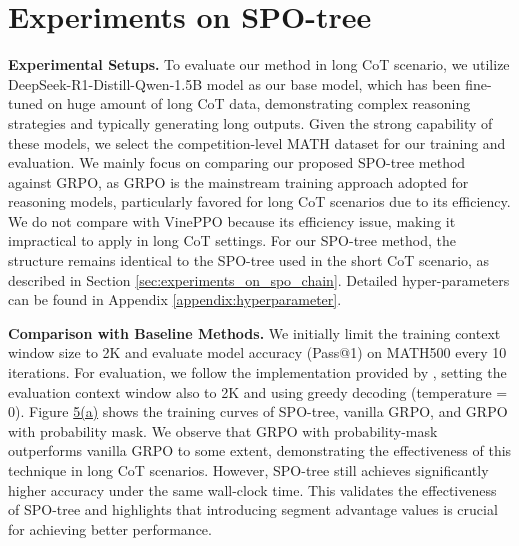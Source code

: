 \section{Experiments on SPO-tree}
\label{sec:experiments_on_spo_tree}

\textbf{Experimental Setups.}
To evaluate our method in long CoT scenario, we utilize DeepSeek-R1-Distill-Qwen-1.5B model as our base model, which has been fine-tuned on huge amount of long CoT data, demonstrating complex reasoning strategies and typically generating long outputs. Given the strong capability of these models, we select the competition-level MATH \cite{hendrycks2021measuringmathematicalproblemsolving} dataset for our training and evaluation. We mainly focus on comparing our proposed SPO-tree method against GRPO, as GRPO is the mainstream training approach adopted for reasoning models, particularly favored for long CoT scenarios due to its efficiency. We do not compare with VinePPO because its efficiency issue, making it impractical to apply in long CoT settings. For our SPO-tree method, the structure remains identical to the SPO-tree used in the short CoT scenario, as described in Section \ref{sec:experiments_on_spo_chain}. Detailed hyper-parameters can be found in Appendix \ref{appendix:hyperparameter}.

\textbf{Comparison with Baseline Methods.}
We initially limit the training context window size to 2K and evaluate model accuracy (Pass@1) on MATH500 every 10 iterations. For evaluation, we follow the implementation provided by \cite{kazemnejad2024vineppounlockingrlpotential}, setting the evaluation context window also to 2K and using greedy decoding (temperature = 0). Figure \hyperref[fig:SPO-tree-results]{5(a)} shows the training curves of SPO-tree, vanilla GRPO, and GRPO with probability mask. We observe that GRPO with probability-mask outperforms vanilla GRPO to some extent, demonstrating the effectiveness of this technique in long CoT scenarios. However, SPO-tree still achieves significantly higher accuracy under the same wall-clock time. This validates the effectiveness of SPO-tree and highlights that introducing segment advantage values is crucial for achieving better performance.

